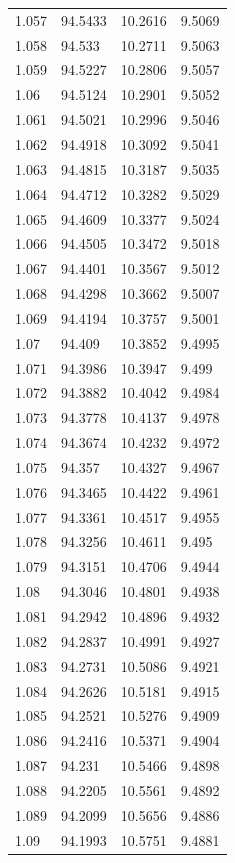 \begin{tabular}{llll}
1.057 & 94.5433 & 10.2616 & 9.5069 \\
1.058 & 94.533 & 10.2711 & 9.5063 \\
1.059 & 94.5227 & 10.2806 & 9.5057 \\
1.06 & 94.5124 & 10.2901 & 9.5052 \\
1.061 & 94.5021 & 10.2996 & 9.5046 \\
1.062 & 94.4918 & 10.3092 & 9.5041 \\
1.063 & 94.4815 & 10.3187 & 9.5035 \\
1.064 & 94.4712 & 10.3282 & 9.5029 \\
1.065 & 94.4609 & 10.3377 & 9.5024 \\
1.066 & 94.4505 & 10.3472 & 9.5018 \\
1.067 & 94.4401 & 10.3567 & 9.5012 \\
1.068 & 94.4298 & 10.3662 & 9.5007 \\
1.069 & 94.4194 & 10.3757 & 9.5001 \\
1.07 & 94.409 & 10.3852 & 9.4995 \\
1.071 & 94.3986 & 10.3947 & 9.499 \\
1.072 & 94.3882 & 10.4042 & 9.4984 \\
1.073 & 94.3778 & 10.4137 & 9.4978 \\
1.074 & 94.3674 & 10.4232 & 9.4972 \\
1.075 & 94.357 & 10.4327 & 9.4967 \\
1.076 & 94.3465 & 10.4422 & 9.4961 \\
1.077 & 94.3361 & 10.4517 & 9.4955 \\
1.078 & 94.3256 & 10.4611 & 9.495 \\
1.079 & 94.3151 & 10.4706 & 9.4944 \\
1.08 & 94.3046 & 10.4801 & 9.4938 \\
1.081 & 94.2942 & 10.4896 & 9.4932 \\
1.082 & 94.2837 & 10.4991 & 9.4927 \\
1.083 & 94.2731 & 10.5086 & 9.4921 \\
1.084 & 94.2626 & 10.5181 & 9.4915 \\
1.085 & 94.2521 & 10.5276 & 9.4909 \\
1.086 & 94.2416 & 10.5371 & 9.4904 \\
1.087 & 94.231 & 10.5466 & 9.4898 \\
1.088 & 94.2205 & 10.5561 & 9.4892 \\
1.089 & 94.2099 & 10.5656 & 9.4886 \\
1.09 & 94.1993 & 10.5751 & 9.4881 \\

\end{tabular}
